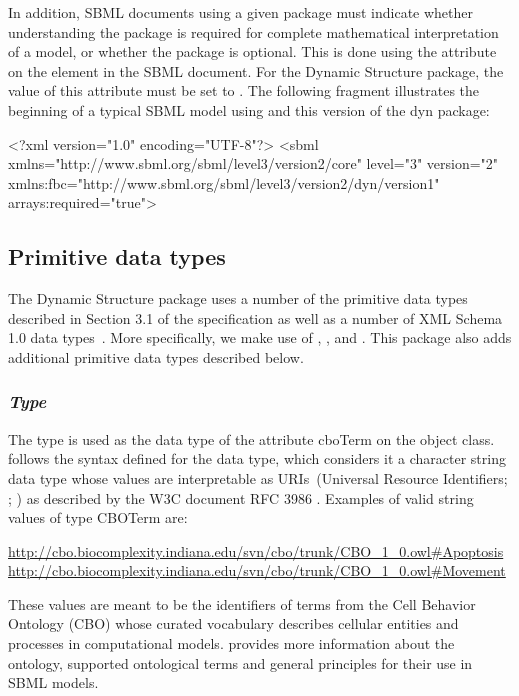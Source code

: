\begin{center}
\end{center}

In addition, SBML documents using a given package must indicate whether
understanding the package is required for complete mathematical
interpretation of a model, or whether the package is optional.  This is
done using the attribute  on the  element in
the SBML document.  For the Dynamic Structure package, the value of
this attribute must be set to .
The following fragment illustrates the beginning of a typical SBML model
using \sbmlthreecore and this version of the dyn package:

\begin{example}
<?xml version="1.0" encoding="UTF-8"?>
<sbml xmlns="http://www.sbml.org/sbml/level3/version2/core" level="3" version="2"
      xmlns:fbc="http://www.sbml.org/sbml/level3/version2/dyn/version1" arrays:required="true">
\end{example}

\subsection{Primitive data types}
\label{subsec:primitives}
The Dynamic Structure package uses a number of the primitive data types described in Section 3.1 of the \sbmlthreecore specification as well as a number of XML Schema 1.0 data types~\citep{biron:2000}. More specifically, we make use of , , and . This package also adds additional primitive data types described below.

\subsubsection{\emph{Type} }
\label{dat:CBOTerm}

The type  is used as the data type of the attribute cboTerm on the \Event object class.  follows the syntax defined for the  data type, which considers it a character string data type whose values are interpretable as URIs~(Universal Resource Identifiers; \citep{Means:2001}; \citep{w3c:2000b}) as described by the W3C document RFC 3986 \citep{Berners-Lee:2005}. Examples of valid string values of type CBOTerm are:  
\begin{center}
\url{http://cbo.biocomplexity.indiana.edu/svn/cbo/trunk/CBO_1_0.owl#Apoptosis} \url{http://cbo.biocomplexity.indiana.edu/svn/cbo/trunk/CBO_1_0.owl#Movement}
\end{center}
These values are meant to be the identifiers of terms from the Cell Behavior Ontology (CBO) whose curated vocabulary describes cellular entities and processes in computational models.  provides more information about the ontology, supported ontological terms and general principles for their use in SBML models.

